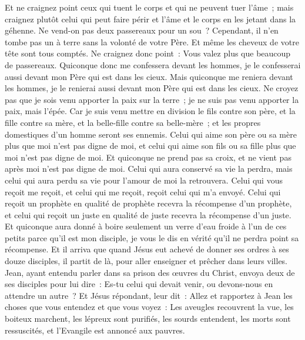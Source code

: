 \begin{multicols}{2}
Et ne craignez point ceux qui tuent le corps et qui ne peuvent tuer l'âme~; mais craignez plutôt celui qui peut faire périr et l'âme et le corps en les jetant dans la géhenne.
Ne vend-on pas deux passereaux pour un sou~? Cependant, il n'en tombe pas un à terre sans la volonté de votre Père.
Et même les cheveux de votre tête sont tous comptés.
Ne craignez donc point~: Vous valez plus que beaucoup de passereaux.
Quiconque donc me confessera devant les hommes, je le confesserai aussi devant mon Père qui est dans les cieux.
Mais quiconque me reniera devant les hommes, je le renierai aussi devant mon Père qui est dans les cieux.
Ne croyez pas que je sois venu apporter la paix sur la terre~; je ne suis pas venu apporter la paix, mais l'épée.
Car je suis venu mettre en division le fils contre son père, et la fille contre sa mère, et la belle-fille contre sa belle-mère~;
et les propres domestiques d'un homme seront ses ennemis.
Celui qui aime son père ou sa mère plus que moi n'est pas digne de moi, et celui qui aime son fils ou sa fille plus que moi n'est pas digne de moi.
Et quiconque ne prend pas sa croix, et ne vient pas après moi n'est pas digne de moi.
Celui qui aura conservé sa vie la perdra, mais celui qui aura perdu sa vie pour l'amour de moi la retrouvera.
Celui qui vous reçoit me reçoit, et celui qui me reçoit, reçoit celui qui m'a envoyé.
Celui qui reçoit un prophète en qualité de prophète recevra la récompense d'un prophète, et celui qui reçoit un juste en qualité de juste recevra la récompense d'un juste.
Et quiconque aura donné à boire seulement un verre d'eau froide à l'un de ces petits parce qu'il est mon disciple, je vous le dis en vérité qu'il ne perdra point sa récompense.
\VerseOne{}Et il arriva que quand Jésus eut achevé de donner ses ordres à ses douze disciples, il partit de là, pour aller enseigner et prêcher dans leurs villes.
Jean, ayant entendu parler dans sa prison des œuvres du Christ, envoya deux de ses disciples pour lui dire~:
Es-tu celui qui devait venir, ou devons-nous en attendre un autre~?
Et Jésus répondant, leur dit~: Allez et rapportez à Jean les choses que vous entendez et que vous voyez~:
Les aveugles recouvrent la vue, les boiteux marchent, les lépreux sont purifiés, les sourds entendent, les morts sont ressuscités, et l'Evangile est annoncé aux pauvres.

\end{multicols}

